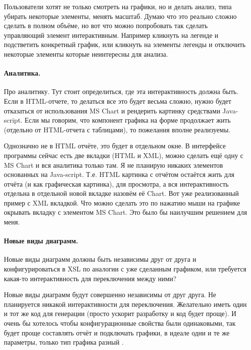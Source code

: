 \documentclass[10pt,a4paper]{article}
\begin{document}
Пользователи хотят не только смотреть на графики, но и делать анализ, типа
убирать некоторые элементы, менять масштаб. Думаю что это реально сложно сделать
в полном объёме, но вот что можно попробовать так сделать управляющий элемент
интерактивным. Например кликнуть на легенде и подстветить конкретный график, или
кликнуть на элементы легенды и отключить некоторые элементы которые неинтересны
для анализа.

\paragraph{Аналитика.}

Про аналитику. Тут стоит определиться, где эта интерактивность должна быть. Если
в HTML-отчете, то делаться все это будет весьма сложно, нужно будет отказаться
от использования MS Chart и рендерить картинку средствами Java-script. Если мы
говорим, что компонент графика на форме продолжает жить (отдельно от HTML-отчета
с таблицами), то пожелания вполне реализуемы.

Однозначно не в HTML отчёте, это будет в отдельном окне. В интерфейсе программы
сейчас есть две вкладки (HTML и XML), можно сделать ещё одну с MS Chart и вся
аналитика только там. Я не планирую никаких элементов основанных на Java-script.
Т.е. HTML картинка с отчётом остаётся жить для отчёта (и как графическая
картинка), для просмотра, а вся интерактивность отдельна в отдельной новой
вкладке назовём её Chart. Вот уже реализованный пример с XML вкладкой. Что можно
сделать это по нажатию мыши на графике окрывать вкладку с элементом MS Chart.
Это было бы наилучшим решением для меня.

\paragraph{Новые виды диаграмм.}

Новые виды диаграмм должны быть независимы друг от друга и конфигурироваться в
XSL по аналогии с уже сделанным графиком, или требуется какая-то интерактивность
для переключения между ними?

Новые виды диаграмм будут совершенно независимы от друг друга. Не планируется
никакой интерактивности для переключения. Желательно иметь один и тот же код для
генерации (просто ускорит разработку и код будет проще). И очень бы хотелось
чтобы конфигурационные свойства были одинаковыми, так будет проще составлять
отчёт и подключать графики, в идеале одни и те же параметры, только тип графика
разный .
\end{document}

